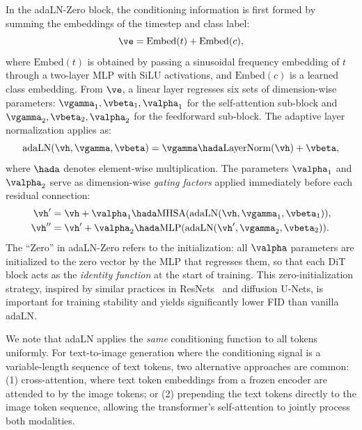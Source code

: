 \documentclass[../../book-main.tex]{subfiles}
\begin{document}
In the adaLN-Zero block, the conditioning information is first formed by summing the embeddings of the timestep and class label:
\begin{equation}
    \ve = \mathrm{Embed}(t) + \mathrm{Embed}(c) ,
\end{equation}
where \(\mathrm{Embed}(t)\) is obtained by passing a sinusoidal frequency embedding of \(t\) through a two-layer MLP with SiLU activations, and \(\mathrm{Embed}(c)\) is a learned class embedding.
From \(\ve\), a linear layer regresses six sets of dimension-wise parameters: \(\vgamma_1, \vbeta_1, \valpha_1\) for the self-attention sub-block and \(\vgamma_2, \vbeta_2, \valpha_2\) for the feedforward sub-block.
The adaptive layer normalization applies as:
\begin{equation}
    \mathrm{adaLN}(\vh, \vgamma, \vbeta) = \vgamma \hada \mathrm{LayerNorm}(\vh) + \vbeta ,
\end{equation}
where \(\hada\) denotes element-wise multiplication.
The parameters \(\valpha_1\) and \(\valpha_2\) serve as dimension-wise \textit{gating factors} applied immediately before each residual connection:
\begin{equation}
\begin{aligned}
    \vh' &= \vh + \valpha_1 \hada \mathrm{MHSA}(\mathrm{adaLN}(\vh, \vgamma_1, \vbeta_1)) , \\
    \vh'' &= \vh' + \valpha_2 \hada \mathrm{MLP}(\mathrm{adaLN}(\vh', \vgamma_2, \vbeta_2)) .
\end{aligned}
\end{equation}
The ``Zero'' in adaLN-Zero refers to the initialization: all \(\valpha\) parameters are initialized to the zero vector by the MLP that regresses them, so that each DiT block acts as the \textit{identity function} at the start of training.
This zero-initialization strategy, inspired by similar practices in ResNets~\citep{goyal2017accurate} and diffusion U-Nets, is important for training stability and yields significantly lower FID than vanilla adaLN.

We note that adaLN applies the \textit{same} conditioning function to all tokens uniformly.
For text-to-image generation where the conditioning signal is a variable-length sequence of text tokens, two alternative approaches are common: (1) cross-attention, where text token embeddings from a frozen encoder are attended to by the image tokens;
or (2) prepending the text tokens directly to the image token sequence, allowing the transformer's self-attention to jointly process both modalities.
\end{document}
